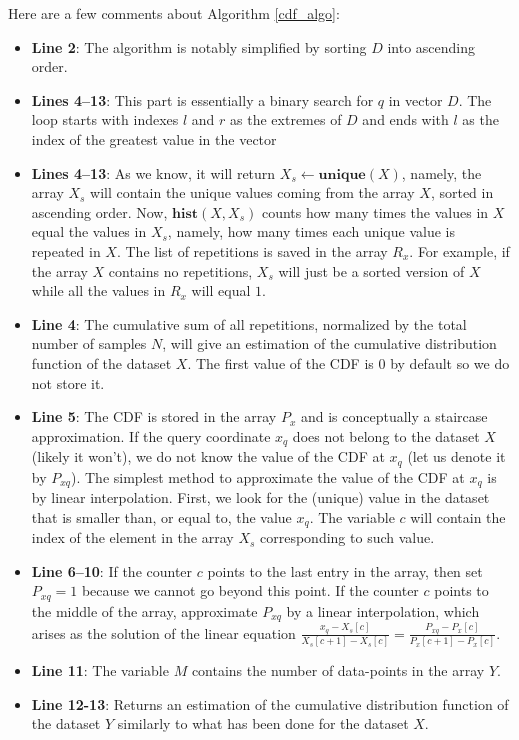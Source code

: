 \documentclass[10pt,final]{siamltex}
\begin{document}
Here are a few comments about Algorithm \ref{cdf_algo}:
\begin{itemize}
  \item \textbf{Line 2}: The algorithm is notably simplified by sorting $D$ into ascending order.
  \item \textbf{Lines 4--13}: This part is essentially a binary search for $q$ in vector $D$. The loop starts with indexes $l$ and $r$ as the extremes of $D$ and ends with $l$ as the index of the greatest value in the vector 
  \item \textbf{Lines 4--13}: As we know, it will return $X_s \gets \mathbf{unique}(X)$, namely, the array $X_s$ will contain the unique values coming from the array $X$, sorted in ascending order. Now, $\mathbf{hist}(X,X_s)$ counts how many times the values in $X$ equal the values in $X_s$, namely, how many times each unique value is repeated in $X$. The list of repetitions is saved in the array $R_x$. For example, if the array $X$ contains no repetitions, $X_s$ will just be a sorted version of $X$ while all the values in $R_x$ will equal $1$.
  \item \textbf{Line 4}: The cumulative sum of all repetitions, normalized by the total number of samples $N$, will give an estimation of the cumulative distribution function of the dataset $X$. The first value of the CDF is $0$ by default so we do not store it.
  \item \textbf{Line 5}: The CDF is stored in the array $P_x$ and is conceptually a staircase approximation. If the query coordinate $x_q$ does not belong to the dataset $X$ (likely it won't), we do not know the value of the CDF at $x_q$ (let us denote it by $P_{xq}$). The simplest method to approximate the value of the CDF at $x_q$ is by linear interpolation. First, we look for the (unique) value in the dataset that is smaller than, or equal to, the value $x_q$. The variable $c$ will contain the index of the element in the array $X_s$ corresponding to such value.
  \item \textbf{Line 6--10}: If the counter $c$ points to the last entry in the array, then set $P_{xq}=1$ because we cannot go beyond this point. If the counter $c$ points to the middle of the array, approximate $P_{xq}$ by a linear interpolation, which arises as the solution of the linear equation $\tfrac{x_q-X_s[c]}{X_s[c+1]-X_s[c]}=\tfrac{P_{xq}-P_x[c]}{P_x[c+1]-P_x[c]}$.
  \item \textbf{Line 11}: The variable $M$ contains the number of data-points in the array $Y$.
  \item \textbf{Line 12-13}: Returns an estimation of the cumulative distribution function of the dataset $Y$ similarly to what has been done for the dataset $X$.

\end{itemize}
\end{document}
